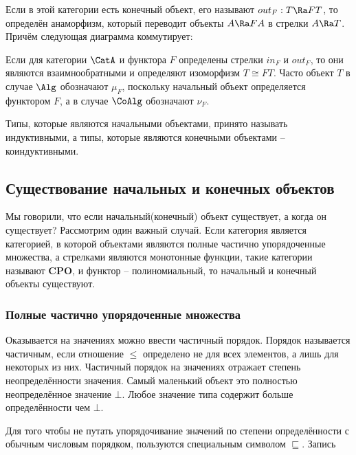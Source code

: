 Если в этой категории есть конечный объект, его называют
$out_F : T \Ra FT$, то определён анаморфизм, который переводит объекты
$A \Ra FA$ в стрелки $A \Ra T$.\\Причём следующая диаграмма коммутирует:

\begin{centering}



\end{centering}

Если для категории $\CatA$ и функтора $F$ определены стрелки $in_F$ и
$out_F$, то они являются взаимнообратными и определяют изоморфизм
$T \cong FT$. Часто объект $T$ в случае $\Alg$ обозначают $\mu_F$,
поскольку начальный объект определяется функтором $F$, а в случае
$\CoAlg$ обозначают $\nu_F$.

Типы, которые являются начальными объектами, принято называть
индуктивными, а типы, которые являются конечными объектами --
коиндуктивными.

\subsection{Существование начальных и конечных объектов}

Мы говорили, что если начальный(конечный) объект существует, а когда он
существует? Рассмотрим один важный случай. Если категория является
категорией, в которой объектами являются полные частично упорядоченные
множества, а стрелками являются монотонные функции, такие категории
называют $\textbf{CPO}$, и функтор -- полиномиальный, то начальный и
конечный объекты существуют.

\subsubsection{Полные частично упорядоченные множества}

Оказывается на значениях можно ввести частичный порядок. Порядок
называется частичным, если отношение $\leq$ определено не для всех
элементов, а лишь для некоторых из них. Частичный порядок на значениях
отражает степень неопределённости значения. Самый маленький объект это
полностью неопределённое значение $\bot$. Любое значение типа содержит
больше определённости чем $\bot$.

Для того чтобы не путать упорядочивание значений по степени
определённости с обычным числовым порядком, пользуются специальным
символом $\sqsubseteq$. Запись

